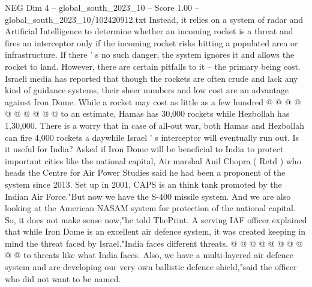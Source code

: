 \begin{textsample}{NEG Dim 4 – global\_south\_2023\_10 – Score 1.00 – global\_south\_2023\_10/102420912.txt}
Instead, it relies on a system of radar and Artificial Intelligence to determine whether an incoming rocket is a threat and fires an interceptor only if the incoming rocket risks hitting a populated area or infrastructure.
If there ' s no such danger, the system ignores it and allows the rocket to land.
However, there are certain pitfalls to it -- the primary being cost.
Israeli media has reported that though the rockets are often crude and lack any kind of guidance systems, their sheer numbers and low cost are an advantage against Iron Dome.
While a rocket may cost as little as a few hundred @ @ @ @ @ @ @ @ @ @ to an estimate, Hamas has 30,000 rockets while Hezbollah has 1,30,000.
There is a worry that in case of all-out war, both Hamas and Hezbollah can fire 4,000 rockets a daywhile Israel ' s interceptor will eventually run out.
Is it useful for India?
Asked if Iron Dome will be beneficial to India to protect important cities like the national capital, Air marshal Anil Chopra ( Retd ) who heads the Centre for Air Power Studies said he had been a proponent of the system since 2013.
Set up in 2001, CAPS is an think tank promoted by the Indian Air Force."But now we have the S-400 missile system.
And we are also looking at the American NASAM system for protection of the national capital.
So, it does not make sense now,"he told ThePrint.
A serving IAF officer explained that while Iron Dome is an excellent air defence system, it was created keeping in mind the threat faced by Israel."India faces different threats. @ @ @ @ @ @ @ @ @ @ to threats like what India faces.
Also, we have a multi-layered air defence system and are developing our very own ballistic defence shield,"said the officer who did not want to be named.

\end{textsample}
